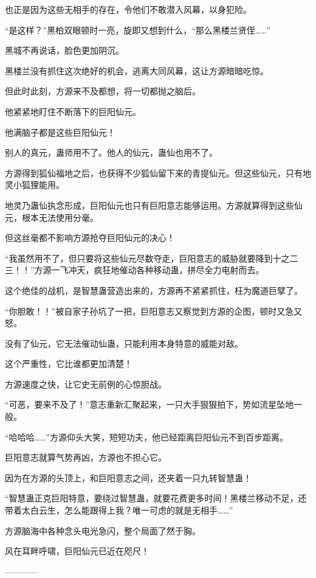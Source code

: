 \begin{this_body}
也正是因为这些无相手的存在，令他们不敢潜入风幕，以身犯险。

“是这样？”黑柏双眼顿时一亮，旋即又想到什么，“那么黑楼兰贤侄……”

黑城不再说话，脸色更加阴沉。

黑楼兰没有抓住这次绝好的机会，逃离大同风幕，这让方源暗暗吃惊。

但此时此刻，方源来不及都想，将一切都抛之脑后。

他紧紧地盯住不断落下的巨阳仙元。

他满脑子都是这些巨阳仙元！

别人的真元，蛊师用不了。他人的仙元，蛊仙也用不了。

方源得到狐仙福地之后，也获得不少狐仙留下来的青提仙元。但这些仙元，只有地灵小狐狸能用。

地灵乃蛊仙执念形成，巨阳仙元也只有巨阳意志能够运用。方源就算得到这些仙元，根本无法使用分毫。

但这丝毫都不影响方源抢夺巨阳仙元的决心！

“我虽然用不了，但只要将这些仙元尽数夺走，巨阳意志的威胁就要降到十之二三！！”方源一飞冲天，疯狂地催动各种移动蛊，拼尽全力电射而去。

这个绝佳的战机，是智慧蛊营造出来的，方源再不紧紧抓住，枉为魔道巨擘了。

“你胆敢！！”被自家子孙坑了一把，巨阳意志又察觉到方源的企图，顿时又急又怒。

没有了仙元，它无法催动仙蛊，只能利用本身特意的威能对敌。

这个严重性，它比谁都更加清楚！

方源速度之快，让它史无前例的心惊胆战。

“可恶，要来不及了！”意志重新汇聚起来，一只大手狠狠拍下，势如流星坠地一般。

“哈哈哈……”方源仰头大笑，短短功夫，他已经距离巨阳仙元不到百步距离。

巨阳意志就算气势再凶，方源也不担心它。

因为在方源的头顶上，和巨阳意志之间，还夹着一只九转智慧蛊！

“智慧蛊正克巨阳特意，要绕过智慧蛊，就要花费更多时间！黑楼兰移动不足，还带着太白云生，怎么能跟得上我？唯一可虑的就是无相手……”

方源脑海中各种念头电光急闪，整个局面了然于胸。

风在耳畔呼啸，巨阳仙元已近在咫尺！

------------

\end{this_body}

